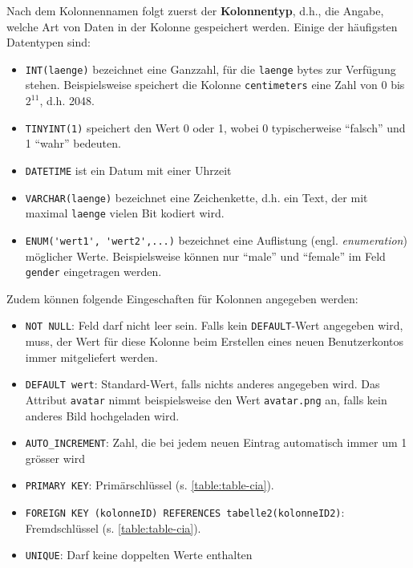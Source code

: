 Nach dem Kolonnennamen folgt zuerst der \textbf{Kolonnentyp}, d.h., die Angabe, welche Art von Daten in der Kolonne gespeichert werden. Einige der häufigsten Datentypen sind:
\begin{itemize}
  \item \lstinline[style=sql]|INT(laenge)| bezeichnet eine Ganzzahl, für die \texttt{laenge} bytes zur Verfügung stehen. Beispielsweise speichert die Kolonne \texttt{centimeters} eine Zahl von 0 bis $2^{11}$, d.h. 2048.
  \item \lstinline[style=sql]|TINYINT(1)| speichert den Wert 0 oder 1, wobei 0 typischerweise ``falsch'' und 1 ``wahr'' bedeuten.
  \item \lstinline[style=sql]|DATETIME| ist ein Datum mit einer Uhrzeit
  \item \lstinline[style=sql]|VARCHAR(laenge)| bezeichnet eine Zeichenkette, d.h. ein Text, der mit maximal \texttt{laenge} vielen Bit kodiert wird.
  \item \lstinline[style=sql]|ENUM('wert1', 'wert2',...)| bezeichnet eine Auflistung (engl. \textit{enumeration}) möglicher Werte. Beispielsweise können nur ``male'' und ``female'' im Feld \texttt{gender} eingetragen werden.
\end{itemize}

Zudem können folgende Eingeschaften für Kolonnen angegeben werden:

\begin{itemize}
  \item \lstinline[style=sql]|NOT NULL|: Feld darf nicht leer sein. Falls kein \lstinline[style=sql]|DEFAULT|-Wert angegeben wird, muss, der Wert für diese Kolonne beim Erstellen eines neuen Benutzerkontos immer mitgeliefert werden.
  \item \lstinline[style=sql]|DEFAULT wert|: Standard-Wert, falls nichts anderes angegeben wird. Das Attribut \texttt{avatar} nimmt beispielsweise den Wert \texttt{avatar.png} an, falls kein anderes Bild hochgeladen wird.
  \item \lstinline[style=sql]|AUTO_INCREMENT|: Zahl, die bei jedem neuen Eintrag automatisch immer um 1 grösser wird
  \item \lstinline[style=sql]|PRIMARY KEY|: Primärschlüssel (s. \cref{table:table-cia}).
  \item \lstinline[style=sql]|FOREIGN KEY (kolonneID) REFERENCES tabelle2(kolonneID2)|: Fremdschlüssel (s. \cref{table:table-cia}).
  \item \lstinline[style=sql]|UNIQUE|: Darf keine doppelten Werte enthalten
\end{itemize}

